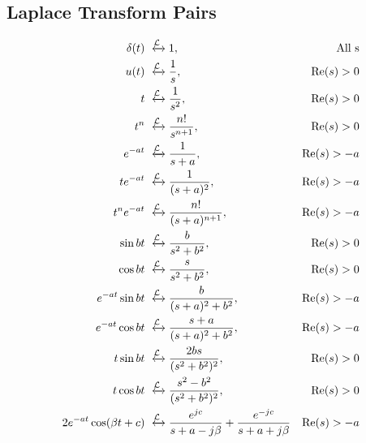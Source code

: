 \subsection{Laplace Transform Pairs}
\begin{align*}
    \delta(t) &\xleftrightarrow{\mathcal{L}} 1, &\text{All s}\\
    u(t) &\xleftrightarrow{\mathcal{L}} \frac{1}{s}, &\text{Re}(s) > 0\\
    t &\xleftrightarrow{\mathcal{L}} \frac{1}{s^2}, &\text{Re}(s) > 0\\
    t^n &\xleftrightarrow{\mathcal{L}} \frac{n!}{s^{n+1}}, &\text{Re}(s) > 0\\
    e^{-at} &\xleftrightarrow{\mathcal{L}} \frac{1}{s+a}, &\text{Re}(s) > -a\\
    te^{-at} &\xleftrightarrow{\mathcal{L}} \frac{1}{(s+a)^2}, &\text{Re}(s) > -a\\
    t^ne^{-at} &\xleftrightarrow{\mathcal{L}} \frac{n!}{(s+a)^{n+1}}, &\text{Re}(s) > -a\\
    \sin bt &\xleftrightarrow{\mathcal{L}} \frac{b}{s^2+b^2}, &\text{Re}(s) > 0\\
    \cos bt &\xleftrightarrow{\mathcal{L}} \frac{s}{s^2+b^2}, &\text{Re}(s) > 0\\
    e^{-at}\sin bt &\xleftrightarrow{\mathcal{L}} \frac{b}{(s+a)^2+b^2}, &\text{Re}(s) > -a\\
    e^{-at}\cos bt &\xleftrightarrow{\mathcal{L}} \frac{s+a}{(s+a)^2+b^2}, &\text{Re}(s) > -a\\
    t\sin bt &\xleftrightarrow{\mathcal{L}} \frac{2bs}{(s^2+b^2)^2}, &\text{Re}(s) > 0\\
    t\cos bt &\xleftrightarrow{\mathcal{L}} \frac{s^2-b^2}{(s^2+b^2)^2}, &\text{Re}(s) > 0\\
    2e^{-at}\cos (\beta t+c) &\xleftrightarrow{\mathcal{L}} \frac{e^{jc}}{s+a-j\beta}+\frac{e^{-jc}}{s+a+j\beta} &\text{Re}(s) > -a
\end{align*}